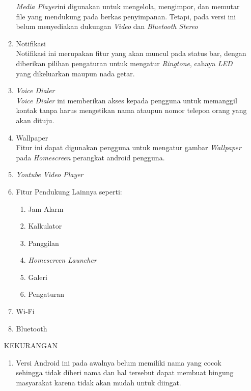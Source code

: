 \begin{enumerate}
\begin{enumerate}
\textit{Media Player}ini digunakan untuk mengelola, mengimpor, dan memutar file yang mendukung pada berkas penyimpanan. Tetapi, pada versi ini belum menyediakan dukungan \textit{Video} dan \textit{Bluetooth Stereo}
\item Notifikasi\\
Notifikasi ini merupakan fitur yang akan muncul pada status bar, dengan diberikan pilihan pengaturan untuk mengatur \textit{Ringtone}, cahaya \textit{LED} yang dikeluarkan maupun nada getar.
\item \textit{Voice Dialer}\\ 
\textit{Voice Dialer} ini memberikan akses kepada pengguna untuk memanggil kontak tanpa harus mengetikan nama ataupun nomor telepon orang yang akan dituju.
\item Wallpaper\\ 
Fitur ini dapat digunakan pengguna untuk mengatur gambar \textit{Wallpaper} pada \textit{Homescreen} perangkat android pengguna. 
\item \textit{Youtube Video Player}
\item Fitur Pendukung Lainnya seperti:
\begin{enumerate}
    \item Jam Alarm
    \item Kalkulator
    \item Panggilan
    \item \textit{Homescreen Launcher}
    \item Galeri
    \item Pengaturan
\end{enumerate}
\item Wi-Fi
\item Bluetooth\\
\end{enumerate}

KEKURANGAN
\begin{enumerate}
    \item Versi Android ini pada awalnya belum memiliki nama yang cocok sehingga tidak diberi nama dan hal tersebut dapat membuat bingung masyarakat karena tidak akan mudah untuk diingat.\\
\end{enumerate}



\end{enumerate}
